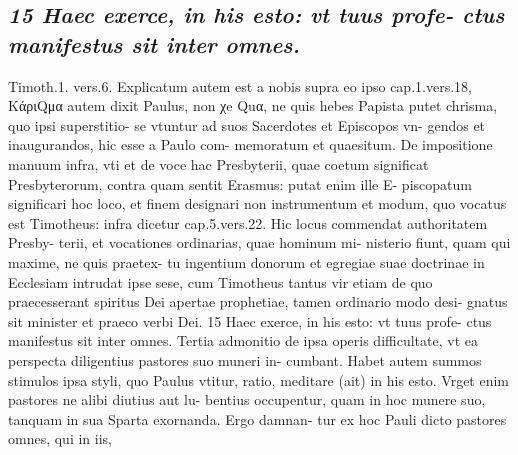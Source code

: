 \documentclass{article}
\begin{document}
\begin{pages}
\subsection*{\textit{15 Haec exerce, in his esto: vt tuus profe- ctus manifestus sit inter omnes.}}Timoth.1. vers.6. Explicatum autem est a nobis supra eo ipso cap.1.vers.18, ΚάριQμα autem dixit Paulus, non χe Quα, ne quis hebes Papista putet chrisma, quo ipsi superstitio- se vtuntur ad suos Sacerdotes et Episcopos vn- gendos et inaugurandos, hic esse a Paulo com- memoratum et quaesitum. De impositione manuum infra, vti et de voce hac Presbyterii, quae coetum significat Presbyterorum, contra quam sentit Erasmus: putat enim ille E- piscopatum significari hoc loco, et finem designari non instrumentum et modum, quo vocatus est Timotheus: infra dicetur cap.5.vers.22. Hic locus commendat authoritatem Presby- terii, et vocationes ordinarias, quae hominum mi- nisterio fiunt, quam qui maxime, ne quis praetex- tu ingentium donorum et egregiae suae doctrinae in Ecclesiam intrudat ipse sese, cum Timotheus tantus vir etiam de quo praecesserant spiritus Dei apertae prophetiae, tamen ordinario modo desi- gnatus sit minister et praeco verbi Dei. 15 Haec exerce, in his esto: vt tuus profe- ctus manifestus sit inter omnes. Tertia admonitio de ipsa operis difficultate, vt ea perspecta diligentius pastores suo muneri in- cumbant. Habet autem summos stimulos ipsa styli, quo Paulus vtitur, ratio, meditare (ait) in his esto. Vrget enim pastores ne alibi diutius aut lu- bentius occupentur, quam in hoc munere suo, tanquam in sua Sparta exornanda. Ergo damnan- tur ex hoc Pauli dicto pastores omnes, qui in iis,  \pend

\end{pages}
\end{document}
